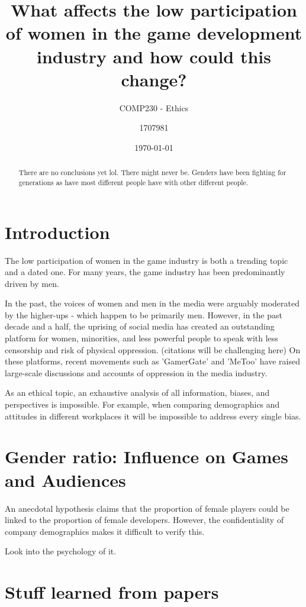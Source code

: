\documentclass{scrartcl}
\title{What affects the low participation of women in the game development industry and how could this change?}
\subtitle{COMP230 - Ethics}
\date{\today}
\author{1707981}
\begin{document}
\maketitle
{}

\begin{abstract}
There are no conclusions yet lol. There might never be. Genders have been fighting for generations as have most different people have with other different people.
\end{abstract}

\section{Introduction}
The low participation of women in the game industry is both a trending topic and a dated one. For many years, the game industry has been predominantly driven by men. 

In the past, the voices of women and men in the media were arguably moderated by the higher-ups - which happen to be primarily men. However, in the past decade and a half, the uprising of social media has created an outstanding platform for women, minorities, and less powerful people to speak with less censorship and risk of physical oppression. (citations will be challenging here) On these platforms, recent movements such as 'GamerGate' and 'MeToo' have raised large-scale discussions and accounts of oppression in the media industry.

As an ethical topic, an exhaustive analysis of all information, biases, and perspectives is impossible. For example, when comparing demographics and attitudes in different workplaces it will be impossible to address every single bias.

\section{}

\section{Gender ratio: Influence on Games and Audiences}
An anecdotal hypothesis claims that the proportion of female players could be linked to the proportion of female developers. However, the confidentiality of company demographics makes it difficult to verify this.

Look into the psychology of it.

\section{Stuff learned from papers}
\end{document}
